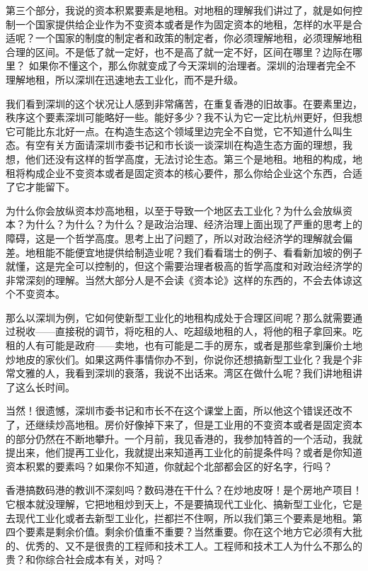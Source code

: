\documentclass[UTF8, 12pt, a4paper]{ctexrep}
\begin{document}
第三个部分，我说的资本积累要素是地租。对地租的理解我们讲过了，就是如何控制一个国家提供给企业作为不变资本或者是作为固定资本的地租，怎样的水平是合适呢？一个国家的制度的制定者和政策的制定者，你必须理解地租，必须理解地租合理的区间。不是低了就一定好，也不是高了就一定不好，区间在哪里？边际在哪里？ 如果你不懂这个，那么你就变成了今天深圳的治理者。深圳的治理者完全不理解地租，所以深圳在迅速地去工业化，而不是升级。

我们看到深圳的这个状况让人感到非常痛苦，在重复香港的旧故事。在要素里边，秩序这个要素深圳可能略好一些。能好多少？我不认为它一定比杭州更好，但我想它可能比东北好一点。在构造生态这个领域里边完全不自觉，它不知道什么叫生态。有空有关方面请深圳市委书记和市长谈一谈深圳在构造生态方面的理想，我想，他们还没有这样的哲学高度，无法讨论生态。第三个是地租。地租的构成，地租将构成企业不变资本或者是固定资本的核心要件，那么你给企业这个东西，合适了它才能留下。

为什么你会放纵资本炒高地租，以至于导致一个地区去工业化？为什么会放纵资本？为什么？为什么？为什么？是政治治理、经济治理上面出现了严重的思考上的障碍，这是一个哲学高度。思考上出了问题了，所以对政治经济学的理解就会偏差。地租能不能便宜地提供给制造业呢？我们看看瑞士的例子、看看新加坡的例子就懂，这是完全可以控制的，但这个需要治理者极高的哲学高度和对政治经济学的非常深刻的理解。当然大部分人是不会读《资本论》这样的东西的，不会去体谅这个不变资本。

那么以深圳为例，它如何使新型工业化的地租构成处于合理区间呢？那么就需要通过税收——直接税的调节，将吃租的人、吃超级地租的人，将他的租子拿回来。吃租的人有可能是政府——卖地，也有可能是二手的房东，或者是那些拿到廉价土地炒地皮的家伙们。如果这两件事情你办不到，你说你还想搞新型工业化？我是个非常文雅的人，我看到深圳的衰落，我说不出话来。湾区在做什么呢？我们讲地租讲了这么长时间。

当然！很遗憾，深圳市委书记和市长不在这个课堂上面，所以他这个错误还改不了，还继续炒高地租。房价好像掉下来了，但是工业用的不变资本或者是固定资本的部分仍然在不断地攀升。一个月前，我见香港的，我参加特首的一个活动，我就提出来，他们提再工业化，我就提出来知道再工业化的前提条件吗？或者是你知道资本积累的要素吗？如果你不知道，你就起个北部都会区的好名字，行吗？

香港搞数码港的教训不深刻吗？数码港在干什么？在炒地皮呀！是个房地产项目！它根本就没理解，它把地租炒到天上，不是要搞现代工业化、搞新型工业化，它是去现代工业化或者去新型工业化，拦都拦不住啊，所以我们第三个要素是地租。第四个要素是剩余价值。剩余价值重不重要？当然重要。你在这个地方它必须有大批的、优秀的、又不是很贵的工程师和技术工人。工程师和技术工人为什么不那么的贵？和你综合社会成本有关，对吗？
\end{document}
